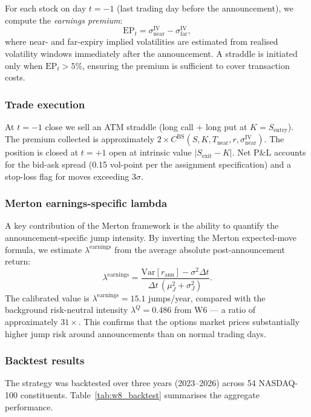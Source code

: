 \documentclass[12pt]{article}
\begin{document}
For each stock on day $t{=}{-1}$ (last trading day before the
announcement), we compute the \emph{earnings premium}:
\[
  \mathrm{EP}_t = \sigma^{\mathrm{IV}}_{\mathrm{near}} 
                - \sigma^{\mathrm{IV}}_{\mathrm{far}},
\]
where near- and far-expiry implied volatilities are estimated from
realised volatility windows immediately after the announcement.
A straddle is initiated only when $\mathrm{EP}_t > 5\%$, ensuring the
premium is sufficient to cover transaction costs.

\subsubsection*{Trade execution}

At $t{=}{-1}$ close we sell an ATM straddle (long call $+$ long put at
$K = S_{\mathrm{entry}}$).
The premium collected is approximately $2 \times C^{\mathrm{BS}}(S,K,T_{\mathrm{near}},r,\sigma^{\mathrm{IV}}_{\mathrm{near}})$.
The position is closed at $t{=}{+1}$ open at intrinsic value
$|S_{\mathrm{exit}} - K|$.
Net P\&L accounts for the bid-ask spread (0.15 vol-point per the
assignment specification) and a stop-loss flag for moves exceeding
$3\sigma$.

\subsubsection*{Merton earnings-specific lambda}

A key contribution of the Merton framework is the ability to quantify
the announcement-specific jump intensity.
By inverting the Merton expected-move formula, we estimate
$\lambda^{\mathrm{earnings}}$ from the average absolute post-announcement
return:
\[
  \lambda^{\mathrm{earnings}}
  = \frac{\mathrm{Var}[r_{\mathrm{ann}}] - \sigma^2 \Delta t}
         {\Delta t\,(\mu_J^2 + \sigma_J^2)}.
\]
The calibrated value is $\lambda^{\mathrm{earnings}} = 15.1$ jumps/year,
compared with the background risk-neutral intensity
$\lambda^Q = 0.486$ from W6 — a ratio of approximately $31\times$.
This confirms that the options market prices substantially higher jump
risk around announcements than on normal trading days.

\subsubsection*{Backtest results}

The strategy was backtested over three years (2023--2026) across 54
NASDAQ-100 constituents.
Table~\ref{tab:w8_backtest} summarises the aggregate performance.
\end{document}
